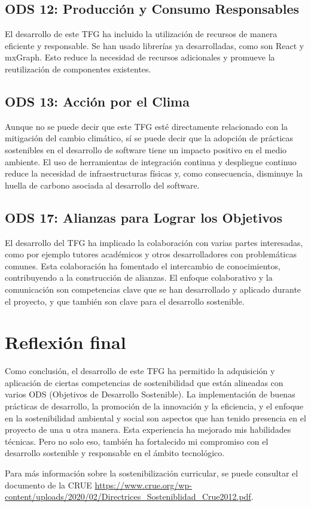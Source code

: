 \subsection{ODS 12: Producción y Consumo Responsables}
El desarrollo de este TFG ha incluido la utilización de recursos de manera eficiente y responsable. Se han usado librerías ya desarrolladas, como son React y mxGraph. Esto reduce la necesidad de recursos adicionales y promueve la reutilización de componentes existentes.

\subsection{ODS 13: Acción por el Clima}
Aunque no se puede decir que este TFG esté directamente relacionado con la mitigación del cambio climático, sí se puede decir que la adopción de prácticas sostenibles en el desarrollo de software tiene un impacto positivo en el medio ambiente.
El uso de herramientas de integración continua y despliegue continuo reduce la necesidad de infraestructuras físicas y, como consecuencia, disminuye la huella de carbono asociada al desarrollo del software.

\subsection{ODS 17: Alianzas para Lograr los Objetivos}
El desarrollo del TFG ha implicado la colaboración con varias partes interesadas, como por ejemplo tutores académicos y otros desarrolladores con problemáticas comunes. Esta colaboración ha fomentado el intercambio de conocimientos, contribuyendo a la construcción de alianzas. El enfoque colaborativo y la comunicación son competencias clave que se han desarrollado y aplicado durante el proyecto, y que también son clave para el desarrollo sostenible.

\section{Reflexión final}
Como conclusión, el desarrollo de este TFG ha permitido la adquisición y aplicación de ciertas competencias de sostenibilidad que están alineadas con varios ODS (Objetivos de Desarrollo Sostenible). 
La implementación de buenas prácticas de desarrollo, la promoción de la innovación y la eficiencia, y el enfoque en la sostenibilidad ambiental y social son aspectos que han tenido presencia en el proyecto de una u otra manera. 
Esta experiencia ha mejorado mis habilidades técnicas. Pero no solo eso, también ha fortalecido mi compromiso con el desarrollo sostenible y responsable en el ámbito tecnológico.

Para más información sobre la sostenibilización curricular, se puede consultar el documento de la CRUE \url{https://www.crue.org/wp-content/uploads/2020/02/Directrices_Sosteniblidad_Crue2012.pdf}.
